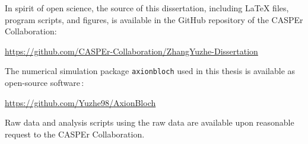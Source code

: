 In spirit of open science, the source of this dissertation, including \LaTeX{} files, program scripts, and figures, is available in the GitHub repository of the CASPEr Collaboration:
\begin{center}
    \url{https://github.com/CASPEr-Collaboration/ZhangYuzhe-Dissertation}
\end{center}

The numerical simulation package \texttt{axionbloch} used in this thesis is available as open-source software\,\cite{Zhang2026_repoAxionBloch}:
\begin{center}
    \url{https://github.com/Yuzhe98/AxionBloch}
\end{center}

Raw data and analysis scripts using the raw data are available upon reasonable request to the CASPEr Collaboration.


